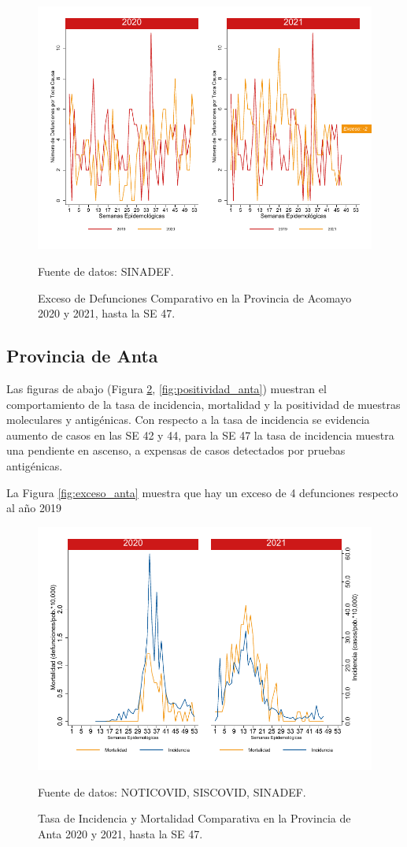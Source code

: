 \documentclass[12pt,a4paper,openany]{book}
\begin{document}
		\begin{figure}[h]
			\caption{Exceso de Defunciones Comparativo en la Provincia de Acomayo 2020 y 2021, hasta la SE 47.}\label{fig:exceso_acomayo}
			\begin{center}
				\includegraphics[width=0.7\linewidth]{../figuras/exceso_1}
			\end{center}
			{\footnotesize {Fuente de datos: SINADEF.}}
		\end{figure}
		
		\clearpage
		
		\subsection*{Provincia de Anta}
		\noindent Las figuras de abajo (Figura \ref{fig:inc_mort_anta}, \ref{fig:positividad_anta}) muestran el comportamiento de la tasa de incidencia, mortalidad y la positividad de muestras moleculares y antigénicas. Con respecto a la tasa de incidencia se evidencia aumento de casos en las SE 42 y 44, para la SE 47 la tasa de incidencia muestra una pendiente en ascenso, a expensas de casos detectados por pruebas antigénicas.
		
		
		La Figura \ref{fig:exceso_anta} muestra que hay un exceso de 4 defunciones respecto al año 2019
		
		\begin{figure}[h]
			\caption{Tasa de Incidencia y Mortalidad Comparativa en la Provincia de Anta 2020 y 2021, hasta la SE 47.}\label{fig:inc_mort_anta}
			\begin{center}
				\includegraphics[width=0.7\linewidth]{../figuras/incidencia_mortalidad_20_21_2}
			\end{center}
			{\footnotesize {Fuente de datos: NOTICOVID, SISCOVID, SINADEF.}}
		\end{figure}
		
\end{document}
